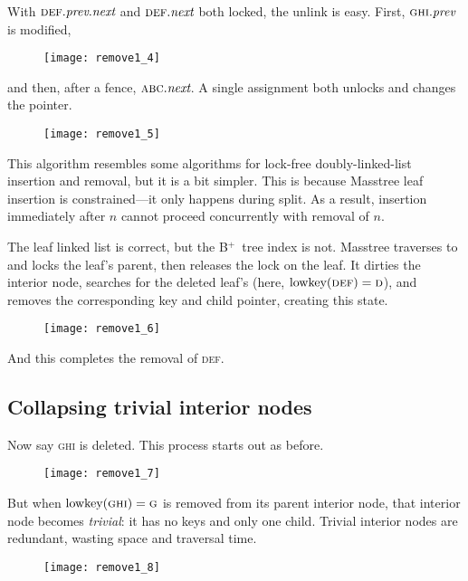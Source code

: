\documentclass[11pt]{article}
\newcommand{\V}[1]{\textit{#1}}
\newcommand{\N}[1]{\text{\upshape{#1}}}
\newcommand{\Bplus}{B\(^+\)}
\newcommand{\ITEM}[1]{\textsc{#1}}
\begin{document}
\noindent%
With \(\ITEM{def}.\V{prev}.\V{next}\) and \(\ITEM{def}.\V{next}\) both
locked, the unlink is easy. First, \(\ITEM{ghi}.\V{prev}\) is modified,

\begin{figure}[H]
\texttt{[image: remove1\_4]}
\end{figure}

\noindent%
and then, after a fence, \(\ITEM{abc}.\V{next}\). A single assignment
both unlocks and changes the pointer.

\begin{figure}[H]
\texttt{[image: remove1\_5]}
\end{figure}

\noindent%
This algorithm resembles some algorithms for lock-free
doubly-linked-list insertion and removal, but it is a bit simpler. This
is because Masstree leaf insertion is constrained---it only happens
during split. As a result, insertion immediately after \(n\) cannot
proceed concurrently with removal of \(n\).

The leaf linked list is correct, but the \Bplus\ tree index is not.
Masstree traverses to and locks the leaf's parent, then releases the
lock on the leaf. It dirties the interior node, searches for the deleted
leaf's \N{lowkey} (here, \(\N{lowkey}(\ITEM{def}) = \ITEM{d}\)), and removes
the corresponding key and child pointer, creating this state.

\begin{figure}[H]
\texttt{[image: remove1\_6]}
\end{figure}

And this completes the removal of \ITEM{def}.

\subsection{Collapsing trivial interior nodes}

Now say \ITEM{ghi} is deleted. This process starts out as before.

\begin{figure}[H]
\texttt{[image: remove1\_7]}
\end{figure}

\noindent%
But when \(\N{lowkey}(\ITEM{ghi}) = \ITEM{g}\) is removed from its
parent interior node, that interior node becomes \emph{trivial}: it has
no keys and only one child. Trivial interior nodes are redundant,
wasting space and traversal time.

\begin{figure}[H]
\texttt{[image: remove1\_8]}
\end{figure}
\end{document}
